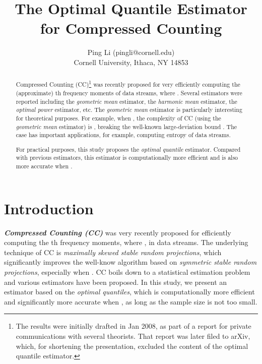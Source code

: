 \documentclass[oneside,10pt]{article}
\begin{document}
\title{The Optimal Quantile Estimator for Compressed Counting}


\author{ Ping Li \hspace{0.01in} (pingli@cornell.edu) \hspace{0.2in} \\
       Cornell University,  Ithaca, NY 14853
  }
\date{}
\maketitle


\begin{abstract}
Compressed Counting (CC)\footnote{The results  were initially drafted in Jan 2008, as part of a report for private communications with several theorists. That report was later filed to arXiv\cite{Article:Li_CC_v0}, which, for shortening the presentation, excluded the content of the optimal quantile estimator. }
was recently proposed for very efficiently computing the (approximate) th frequency moments of data streams, where . Several estimators were reported including the {\em geometric mean} estimator, the {\em harmonic mean} estimator, the {\em optimal power} estimator, etc. The {\em geometric mean} estimator is particularly interesting for theoretical purposes. For example, when , the complexity of CC (using the {\em geometric mean} estimator) is , breaking the well-known large-deviation bound . The case  has  important applications, for example, computing entropy of data streams.

For practical purposes, this study proposes the {\em optimal quantile} estimator. Compared with previous estimators, this estimator is computationally more efficient and is also more accurate when .

\end{abstract}


\section{Introduction}

\textbf{\em Compressed Counting (CC)}\cite{Article:Li_CC,Article:Li_CC_v0} was very recently proposed for efficiently computing the th frequency moments, where , in data streams. The underlying technique of CC is {\em maximally skewed stable random projections}, which significantly improves the well-know algorithm based on {\em symmetric stable random projections}\cite{Article:Indyk_JACM06,Proc:Li_SODA08}, especially when . CC boils down to a statistical estimation problem and various estimators have been  proposed\cite{Article:Li_CC,Article:Li_CC_v0}. In this study, we present an estimator based on the {\em optimal quantiles}, which is computationally more efficient and significantly more accurate when , as long as the sample size is not too small.
\end{document}
